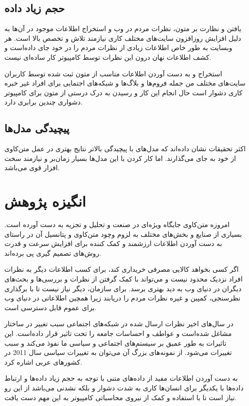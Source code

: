 \documentclass[12pt, a4paper, oneside]{report}
\begin{document}
\subsection{حجم زیاد داده}

یافتن و نظارت بر متون، نظرات مردم در وب و استخراج اطلاعات موجود در آن‌ها به دلیل افزایش روزافزون
سایت‌های مختلف کاری نیازمند تلاش و تخصص بالا است.
هر وبسایت به طور خاص اطلاعات زیادی از نظرات مردم را در خود جای داده‌است و کشف اطلاعات نهان
درون این نظرات توسط کامپیوتر کار ساده‌ای نیست.

استخراج و به دست آوردن اطلاعات مناسب از متون ثبت شده توسط کاربران سایت‌های مختلف من جمله
فروم‌ها و بلاگ‌ها و شبکه‌های اجتمایی برای افراد غیر خبره کاری دشوار است حال انجام این کار و رسیدن
به درک درستی از متون برای کامپیوتر دشواری چندین برابری دارد.
\cite{zhang2018deep}

\subsection{پیچیدگی مدل‌ها}

اکثر تحقیقات نشان داده‌اند که مدل‌های با پیچیدگی بالاتر نتایج بهتری در عمل متن‌کاوی از خود به جای می‌گذارند.
اما کار کردن با این مدل‌ها بسیار زمان‌بر و نیازمند سخت افزار قوی می‌باشد\cite{8844895}.

\section{انگیزه پژوهش}

امروزه متن‌کاوی جایگاه ویژه‌ای در صنعت و تحلیل و تجزیه به دست آورده است. بسیاری از صنایع
و بخش‌های مختلف به لزوم وچود متن‌کاوی و پتانسیل آن در راستای به دست آوردن اطلاعات ارزشمند
و کمک کننده برای افزایش سرعت و قدرت روش‌های تصمیم گیری پی برده‌اند\cite{8844895}.

اگر کسی بخواهد کالایی مصرفی خریداری کند، برای کسب اطلاعات دیگر به نظرات افراد نزدیک
محدود نیست و می‌تواند با کمک گرفتن از نظرات و بررسی‌ها و بحث‌های دیگران در دنیای وب به دید
بهتری برسد. برای سازمان، دیگر نیاز نیست تا با برگذاری نظرسنجی، کمپین و غیره نظرات مردم
را دریابند زیرا همچین اطلاعاتی در دنیای وب برای عموم قابل دسترسی است.

در سال‌های اخیر نظرات ارسال شده در شبکه‌های اجتماعی سبب تغییر در ساختار مشاغل شده‌است و
عواطف و احساسات جامعه را تحت تاثیر قرار داده‌است. این تاثیرات به طور عمیق بر سیستم‌های اجتماعی
و سیاسی ما نفوذ می‌کند و سبب تغییرات می‌شود. از نمونه‌های بزرگ آن می‌توان به تغییرات سیاسی سال
2011
در کشورهای عربی اشاره کرد.

به دست آوردن اطلاعات مفید از داده‌های متنی با توجه به حجم زیاد داده‌ها و ارتباط داده‌ها با یکدیگر
برای انسان‌ها کاری به شدت دشوار و بلکه نشدنی می‌باشد از این رو نیاز است تا با استفاده و کمک
از نیروی محاسباتی کامپیوتر به این مهم دست یافت.
\cite{zhang2018deep}
\end{document}
